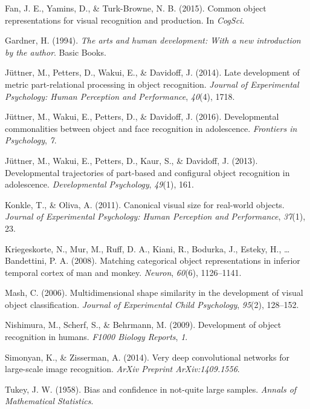 \documentclass[10pt, letterpaper]{article}
\begin{document}
\hypertarget{ref-fan2015common}{}
Fan, J. E., Yamins, D., \& Turk-Browne, N. B. (2015). Common object
representations for visual recognition and production. In \emph{CogSci}.

\hypertarget{ref-gardner1994arts}{}
Gardner, H. (1994). \emph{The arts and human development: With a new
introduction by the author}. Basic Books.

\hypertarget{ref-juttner2014late}{}
Jüttner, M., Petters, D., Wakui, E., \& Davidoff, J. (2014). Late
development of metric part-relational processing in object recognition.
\emph{Journal of Experimental Psychology: Human Perception and
Performance}, \emph{40}(4), 1718.

\hypertarget{ref-juttner2016developmental}{}
Jüttner, M., Wakui, E., Petters, D., \& Davidoff, J. (2016).
Developmental commonalities between object and face recognition in
adolescence. \emph{Frontiers in Psychology}, \emph{7}.

\hypertarget{ref-juttner2013developmental}{}
Jüttner, M., Wakui, E., Petters, D., Kaur, S., \& Davidoff, J. (2013).
Developmental trajectories of part-based and configural object
recognition in adolescence. \emph{Developmental Psychology},
\emph{49}(1), 161.

\hypertarget{ref-konkle2011canonical}{}
Konkle, T., \& Oliva, A. (2011). Canonical visual size for real-world
objects. \emph{Journal of Experimental Psychology: Human Perception and
Performance}, \emph{37}(1), 23.

\hypertarget{ref-kriegeskorte2008matching}{}
Kriegeskorte, N., Mur, M., Ruff, D. A., Kiani, R., Bodurka, J., Esteky,
H., \ldots{} Bandettini, P. A. (2008). Matching categorical object
representations in inferior temporal cortex of man and monkey.
\emph{Neuron}, \emph{60}(6), 1126--1141.

\hypertarget{ref-mash2006}{}
Mash, C. (2006). Multidimensional shape similarity in the development of
visual object classification. \emph{Journal of Experimental Child
Psychology}, \emph{95}(2), 128--152.

\hypertarget{ref-nishimura2009}{}
Nishimura, M., Scherf, S., \& Behrmann, M. (2009). Development of object
recognition in humans. \emph{F1000 Biology Reports}, \emph{1}.

\hypertarget{ref-simonyan2014very}{}
Simonyan, K., \& Zisserman, A. (2014). Very deep convolutional networks
for large-scale image recognition. \emph{ArXiv Preprint
ArXiv:1409.1556}.

\hypertarget{ref-Tukey:1958wn}{}
Tukey, J. W. (1958). Bias and confidence in not-quite large samples.
\emph{Annals of Mathematical Statistics}.
\end{document}
